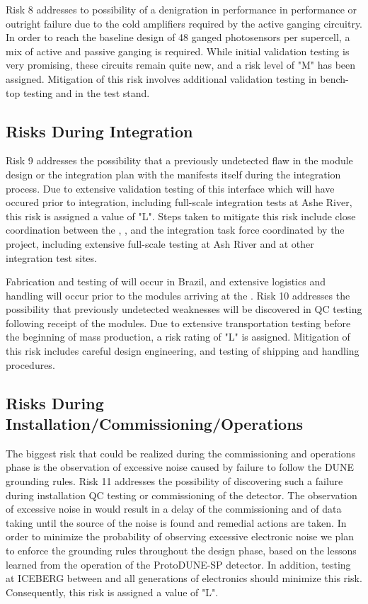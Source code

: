 Risk 8 addresses to possibility of a denigration in performance in  performance or outright failure due to the cold amplifiers required by the active ganging circuitry.  In order to reach the baseline design of 48 ganged photosensors per  supercell, a mix of active and passive ganging is required.  While initial validation testing is very promising, these circuits remain quite new, and a risk level of "M" has been assigned.  Mitigation of this risk involves additional validation testing in bench-top testing and in the  test stand.

\subsection{Risks During Integration}

Risk 9 addresses the possibility that a previously undetected flaw in the  module design or the integration plan with the  manifests itself during the integration process.  Due to extensive validation testing of this interface which will have occured prior to integration, including full-scale integration tests at Ashe River, this risk is assigned a value of "L".  Steps taken to mitigate this risk include close coordination between the , ,  and the integration task force coordinated by the project, including extensive full-scale testing at Ash River and at other integration test sites.

Fabrication and testing of  will occur in Brazil, and extensive logistics and handling will occur prior to the modules arriving at the .  Risk 10 addresses the possibility that previously undetected weaknesses will be discovered in QC testing following receipt of the modules.  Due to extensive transportation testing before the beginning of mass production, a risk rating of "L" is assigned.  Mitigation of this risk includes careful design engineering, and testing of shipping and handling procedures.


\subsection{Risks During Installation/Commissioning/Operations}

The biggest risk that could be realized during the commissioning and operations phase is
the observation of excessive noise caused by failure to follow the DUNE
grounding rules.  Risk 11 addresses the possibility of discovering such a failure during installation QC testing or commissioning of the detector.  The observation of excessive noise in 
would result in a delay of the commissioning and of data taking until the source of the noise is
found and remedial actions are taken. In order to minimize the probability of observing excessive
electronic noise we plan to enforce the grounding rules throughout the design phase, based on
the lessons learned from the operation of the ProtoDUNE-SP detector.  In addition, testing at ICEBERG between  and all generations of  electronics should minimize this risk.  Consequently, this risk is assigned a value of "L".  

